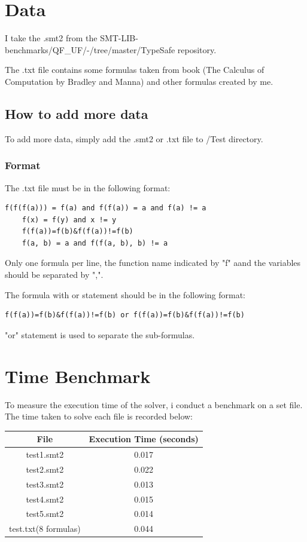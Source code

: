 \documentclass[11pt]{report}
\begin{document}
\section*{Data}
I take the .smt2 from the SMT-LIB-benchmarks/QF\_UF/-/tree/master/TypeSafe repository. 

The .txt file contains some formulas taken from book (The Calculus of Computation by Bradley and Manna) and other formulas created by me.

\subsection*{How to add more data}
To add more data, simply add the .smt2 or .txt file to /Test directory.
\subsubsection*{Format}
The .txt file must be in the following format:
\begin{lstlisting}[style=pythoncode]
    f(f(f(a))) = f(a) and f(f(a)) = a and f(a) != a
    f(x) = f(y) and x != y
    f(f(a))=f(b)&f(f(a))!=f(b)
    f(a, b) = a and f(f(a, b), b) != a
\end{lstlisting}
Only one formula per line, the function name indicated by "f" aand the variables should be separated by ",".

The formula with or statement should be in the following format:
\begin{lstlisting}[style=pythoncode]
    f(f(a))=f(b)&f(f(a))!=f(b) or f(f(a))=f(b)&f(f(a))!=f(b)
\end{lstlisting}

"or" statement is used to separate the sub-formulas.



\section*{Time Benchmark}
To measure the execution time of the solver, i conduct a benchmark on a set file. The time taken to solve each file is recorded below:
\begin{center}
\begin{tabular}{|c|c|}
\hline
\textbf{File} & \textbf{Execution Time (seconds)} \\
\hline
test1.smt2 & 0.017 \\
test2.smt2 & 0.022 \\
test3.smt2 & 0.013 \\
test4.smt2 & 0.015 \\
test5.smt2 & 0.014 \\
test.txt(8 formulas) & 0.044 \\

\hline
\end{tabular}
\end{center}
    
\end{document}
